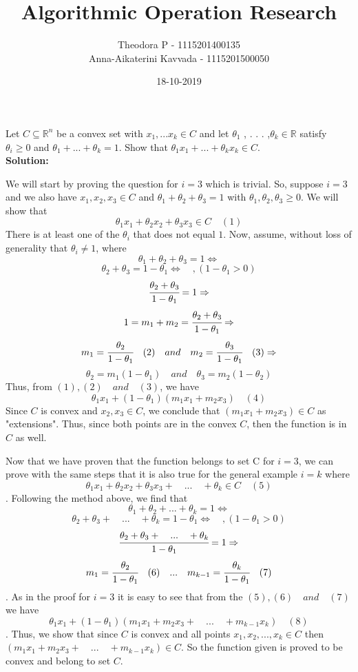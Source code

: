 \documentclass[10pt]{article}
\title{Algorithmic Operation Research}
\date{18-10-2019}
\author{Theodora P - 1115201400135 \\ Anna-Aikaterini Kavvada - 1115201500050}
\newcommand{\R}{\mathbb{R}}
\begin{document}
	\maketitle{}
  	
  	\begin{center}
  	\section{}
  	\end{center}\par
  	Let  $C \subseteq \R^n$ be a convex set with $x_1 , . . . x_k \in C$ and let $			\theta_1$ , . . . ,$\theta_k \in \R $
  	satisfy $\theta_i \geq 0$ and $\theta_1 + . . . + \theta_k = 1 $. Show that $\theta_1 x_1 + . . . + \theta_k x_k \in C $.\\
  	\textbf{Solution:}\par
  	We will start by proving the question for $i = 3$ which is trivial. So, suppose $i = 3$  and we also have $x_1, x_2, x_3 \in C$ and $\theta_1 + \theta_2 + \theta_3 = 1$ with $\theta_1, \theta_2, \theta_3 \geq 0$. 
  	  We will show that $$\theta_1 x_1 + \theta_2 x_2 + \theta_3 x_3 \in C\quad (1)$$ 
  	  There is at least one of the $\theta_i$ that does not equal $1$.
  	  Now, assume, without loss of generality that $\theta_i \neq 1$, where $$\theta_1 + \theta_2 + \theta_3 = 1 \iff $$$$\theta_2 + \theta_3 = 1 - \theta_1 \iff\quad,   (1 - \theta_1 > 0)$$ $$\cfrac{\theta_2 + \theta_3}{1-\theta_1} = 1 \Rightarrow$$ $$1 = m_1 + m_2 = \cfrac{\theta_2 + \theta_3}{1-\theta_1} \Rightarrow$$ $$m_1 = \cfrac{\theta_2}{1-\theta_1}\quad(2)\quad and \quad m_2 = \cfrac{\theta_3}{1-\theta_1}\quad(3)\Rightarrow$$ $$\theta_2 = m_1(1 - \theta_1)\quad and \quad \theta_3 = m_2(1 - \theta_2)$$ 
  	  Thus, from $(1), (2)\quad and\quad (3)$, we have 	$$\theta_1 x_1 + (1 - \theta_1)(m_1 x_1 + m_2 x_3)\quad (4)$$
  	  Since $C$ is convex and $x_2, x_3 \in C$, we conclude that $(m_1 x_1 + m_2 x_3) \in C$ as "extensions". Thus, since both points are in the convex $C$, then the function is in $C$ as well.\par 
  	  \newpage
  	  Now that we have proven that the function belongs to set C for $i = 3$, we can prove with the same steps that it is also true for the general example $i = k$ where $$\theta_1 x_1 + \theta_2 x_2 + \theta_3 x_3 +\quad . . .\quad +\theta_k \in C\quad (5)$$. Following the method above, we find that $$\theta_1 + \theta_2 + ... + \theta_k = 1 \iff$$ $$\theta_2 + \theta_3 +\quad . . .\quad + \theta_k = 1 - \theta_1 \iff \quad,   (1 - \theta_1 > 0)$$ $$\cfrac{\theta_2 + \theta_3 +\quad . . .\quad +\theta_k}{1-\theta_1} = 1 \Rightarrow$$ $$m_1 = \cfrac{\theta_2}{1-\theta_1}\quad (6)\quad . . .\quad m_{k-1} = \cfrac{\theta_k}{1 - \theta_1}\quad (7)$$. As in the proof for $i = 3$ it is easy to see that from the $(5), (6)\quad and\quad (7)$ we have $$\theta_1 x_1 + (1 - \theta_1)(m_1 x_1 + m_2 x_3 +\quad . . .\quad + m_{k-1} x_k)\quad (8)$$. Thus, we show that since $C$ is convex and all points $x_1, x_2, ..., x_k \in C$ then $(m_1 x_1 + m_2 x_3 +\quad . . .\quad + m_{k-1} x_k) \in C$. So the function given is proved to be convex and belong to set $C$.
  	\newpage
  	
\end{document}
